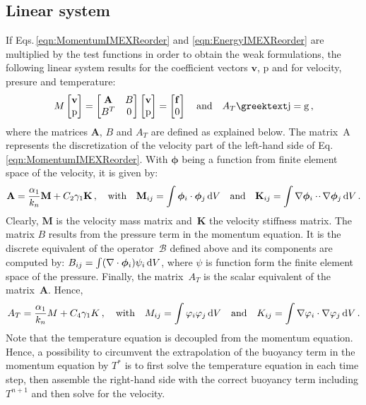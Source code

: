 \subsection{Linear system}
If Eqs.\,\eqref{eqn:MomentumIMEXReorder} and \eqref{eqn:EnergyIMEXReorder} are multiplied by the test functions in order to obtain the weak formulations, the following linear system results for the coefficient vectors $\mathbf{v}$, $\mathrm{p}$ and \gtheta for velocity, presure and temperature:
\begin{equation}
	M\begin{bmatrix} \mathbf{v} \\ \mathrm{p} \end{bmatrix}
	=\begin{bmatrix}
		\mathbf{A} & B\\
		B^T & 0
	\end{bmatrix}
	\begin{bmatrix}	\mathbf{v} \\ \mathrm{p}	\end{bmatrix}
	=\begin{bmatrix} \mathbf{f} \\ 0 \end{bmatrix}\quad\text{and}\quad
	A_T\gtheta=\mathrm{g}\,,
\end{equation}
where the matrices $\mathbf{A}$, $B$ and $A_T$ are defined as explained below. The matrix~$\mathrm{A}$ represents the discretization of the velocity part of the left-hand side of Eq.\,\eqref{eqn:MomentumIMEXReorder}. With $\bm{\phi}$ being a function from finite element space of the velocity, it is given by:
\begin{equation}
	\mathbf{A}=\frac{\alpha_1}{k_n}\mathbf{M}+C_2\gamma_1\mathbf{K}\,,\quad
	\text{with}\quad
	\mathbf{M}_{ij}=\int\bm{\phi}_i\cdot\bm{\phi}_j\,\mathrm{d}V\quad
	\text{and}\quad
	\mathbf{K}_{ij}=\int\nabla\bm{\phi}_i{{}\cdot\!\cdot{}\,{}}\nabla\bm{\phi}_j\,\mathrm{d}V\,.
\end{equation}
Clearly, $\mathbf{M}$ is the velocity mass matrix and~$\mathbf{K}$ the velocity stiffness matrix. The matrix $B$ results from the pressure term in the momentum equation. It is the discrete equivalent of the operator~$\mathcal{B}$ defined above and its components are computed by: $B_{ij}=\int(\nabla\cdot\bm{\phi}_i)\psi_i\,\mathrm{d}V$, where $\psi$ is function form the finite element space of the pressure. Finally, the matrix~$A_T$ is the scalar equivalent of the matrix~$\mathbf{A}$. Hence,
\begin{equation}
	A_T=\frac{\alpha_1}{k_n}M+C_4\gamma_1K\,,\quad
	\text{with}\quad
	M_{ij}=\int\varphi_i\varphi_j\,\mathrm{d}V\quad
	\text{and}\quad
	K_{ij}=\int\nabla\varphi_i\cdot\nabla\varphi_j\,\mathrm{d}V\,.
\end{equation}
Note that the temperature equation is decoupled from the momentum equation. Hence, a possibility to circumvent the extrapolation of the buoyancy term in the momentum equation by $T^*$ is to first solve the temperature equation in each time step, then assemble the right-hand side with the correct buoyancy term including $T^{n+1}$ and then solve for the velocity.

